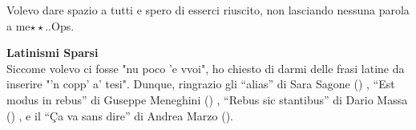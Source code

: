 \documentclass[a4paper,10pt, oneside]{book} %
\theoremstyle{definition}
\begin{document}
Volevo dare spazio a tutti e spero di esserci riuscito, non lasciando nessuna parola a me$\star \star$..Ops.

\textbf{Latinismi Sparsi}
\\Siccome volevo ci fosse "nu poco 'e vvoi", ho chiesto di darmi delle frasi latine da inserire "'n copp' a' tesi". Dunque, ringrazio gli 
``alias'' di Sara Sagone ()
, ``Est modus in rebus'' di Guseppe Meneghini ()
, ``Rebus sic stantibus'' di Dario Massa ()
, e il ``Ça va sans dire'' di Andrea Marzo ().




\end{document}
